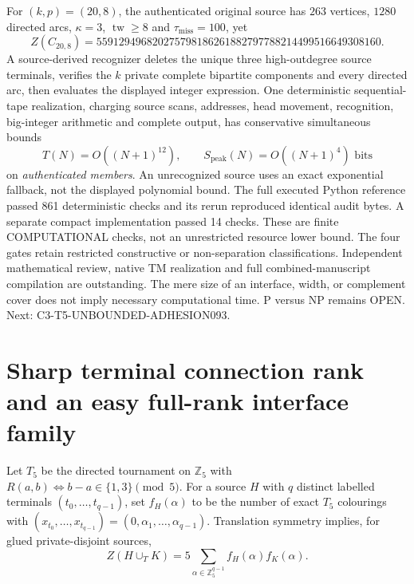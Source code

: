 \documentclass[11pt]{article}
\begin{document}
For $(k,p)=(20,8)$, the authenticated original source
has $263$ vertices, $1280$ directed arcs,
$\kappa=3$, $\operatorname{tw}\ge8$ and
$\tau_{\mathrm{miss}}=100$, yet
\[
Z(C_{20,8})=
559129496820275798186261882797788214499516649308160.
\]
A source-derived recognizer deletes the unique three high-outdegree
source terminals, verifies the $k$ private complete bipartite
components and every directed arc, then evaluates the displayed
integer expression. One deterministic sequential-tape realization,
charging source scans, addresses, head movement, recognition,
big-integer arithmetic and complete output, has conservative
simultaneous bounds
\[
T(N)=O((N+1)^{12}),\qquad
S_{\mathrm{peak}}(N)=O((N+1)^4)\text{ bits}
\]
on \emph{authenticated members}. An unrecognized source uses an
exact exponential fallback, not the displayed polynomial bound.
The full executed Python reference passed 861 deterministic checks
and its rerun reproduced identical audit bytes. A separate compact
implementation passed 14 checks. These are finite COMPUTATIONAL
checks, not an unrestricted resource lower bound. The four gates
retain restricted constructive or non-separation classifications.
Independent mathematical review, native TM realization and full
combined-manuscript compilation are outstanding.
The mere size of an interface, width, or complement cover does
not imply necessary computational time. P versus NP remains OPEN.
Next: C3-T5-UNBOUNDED-ADHESION093.


\section{Sharp terminal connection rank and an easy full-rank interface family}
Let $T_5$ be the directed tournament on $\mathbb Z_5$ with
$R(a,b)\Longleftrightarrow b-a\in\{1,3\}\pmod 5$.
For a source $H$ with $q$ distinct labelled terminals
$(t_0,\ldots,t_{q-1})$, set
$f_H(\alpha)$ to be the number of exact $T_5$ colourings with
$(x_{t_0},\ldots,x_{t_{q-1}})=(0,\alpha_1,\ldots,\alpha_{q-1})$.
Translation symmetry implies, for glued private-disjoint sources,
\[
Z(H\cup_T K)=5\sum_{\alpha\in\mathbb Z_5^{q-1}}
f_H(\alpha)f_K(\alpha).
\]
\end{document}
